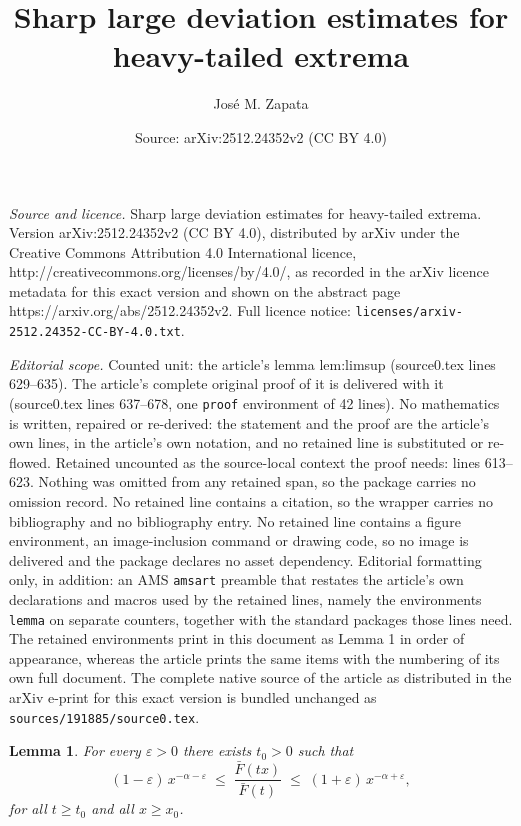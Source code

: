 \documentclass[10pt,a4paper]{amsart}
\title{Sharp large deviation estimates for heavy-tailed extrema}
\author{Jos\'e M. Zapata}
\date{Source: arXiv:2512.24352v2 (CC BY 4.0)}
\newtheorem{lemma}{Lemma}
\begin{document}
\maketitle

\noindent\emph{Source and licence.} Sharp large deviation estimates for heavy-tailed extrema. Version arXiv:2512.24352v2 (CC BY 4.0), distributed by arXiv under the Creative Commons Attribution 4.0 International licence, http://creativecommons.org/licenses/by/4.0/, as recorded in the arXiv licence metadata for this exact version and shown on the abstract page https://arxiv.org/abs/2512.24352v2. Full licence notice: \texttt{licenses/arxiv-2512.24352-CC-BY-4.0.txt}.\par\smallskip

\noindent\textit{Editorial scope.} Counted unit: the article's lemma lem:limsup (source0.tex lines 629--635). The article's complete original proof of it is delivered with it (source0.tex lines 637--678, one \texttt{proof} environment of 42 lines). No mathematics is written, repaired or re-derived: the statement and the proof are the article's own lines, in the article's own notation, and no retained line is substituted or re-flowed.  Retained uncounted as the source-local context the proof needs: lines 613--623.  Nothing was omitted from any retained span, so the package carries no omission record.  No retained line contains a citation, so the wrapper carries no bibliography and no bibliography entry.  No retained line contains a figure environment, an image-inclusion command or drawing code, so no image is delivered and the package declares no asset dependency.  Editorial formatting only, in addition: an AMS \texttt{amsart} preamble that restates the article's own declarations and macros used by the retained lines, namely the environments \texttt{lemma} on separate counters, together with the standard packages those lines need.  The retained environments print in this document as Lemma 1 in order of appearance, whereas the article prints the same items with the numbering of its own full document.  The complete native source of the article as distributed in the arXiv e-print for this exact version is bundled unchanged as \texttt{sources/191885/source0.tex}.
\begin{lemma}\label{lem:Potter} 
For every $\varepsilon>0$ there exists $t_0>0$ such that
\[
(1-\varepsilon)\,x^{-\alpha-\varepsilon}
\;\le\;
\frac{\bar F(tx)}{\bar F(t)}
\;\le\;
(1+\varepsilon)\,x^{-\alpha+\varepsilon},
\]
for all $t\ge t_0$ and all $x\ge x_0$.
\end{lemma}
\end{document}

